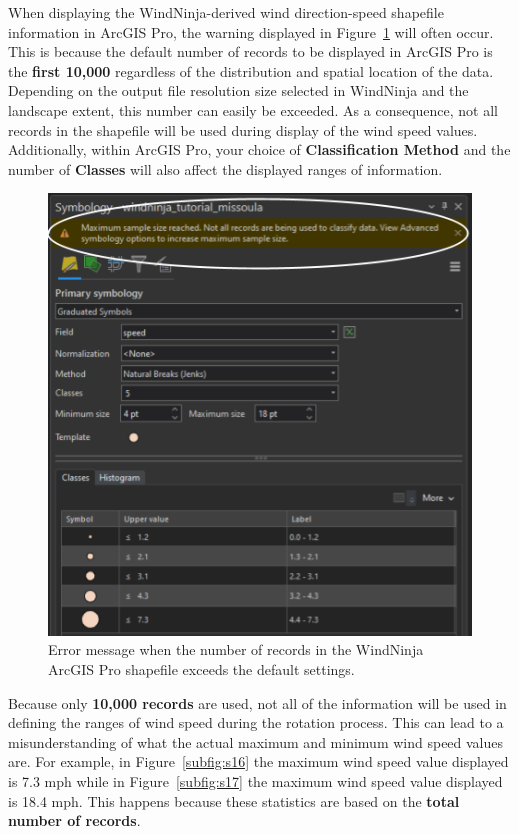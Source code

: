 \documentclass[12pt]{article}
\begin{document}
When displaying the WindNinja-derived wind direction-speed shapefile information in ArcGIS Pro, the warning displayed in Figure~\ref{fig:Figure16} will often occur. This is because the default number of records to be displayed in ArcGIS Pro is the \textbf{first 10,000} regardless of the distribution and spatial location of the data. Depending on the output file resolution size selected in WindNinja and the landscape extent, this number can easily be exceeded. As a consequence, not all records in the shapefile will be used during display of the wind speed values. Additionally, within ArcGIS Pro, your choice of \textbf{Classification Method} and the number of \textbf{Classes} will also affect the displayed ranges of information.

\begin{figure}[H]
	\centering
	\includegraphics[scale=0.55]{arc_7.png}
	\caption{Error message when the number of records in the WindNinja ArcGIS Pro shapefile exceeds the default settings.}
\label{fig:Figure16}
\end{figure}

Because only \textbf{10,000 records} are used, not all of the information will be used in defining the ranges of wind speed during the rotation process. This can lead to a misunderstanding of what the actual maximum and minimum wind speed values are. For example, in Figure~\ref{subfig:s16} the maximum wind speed value displayed is 7.3 mph while in Figure~\ref{subfig:s17} the maximum wind speed value displayed is 18.4 mph. This happens because these statistics are based on the \textbf{total number of records}.
\end{document}
